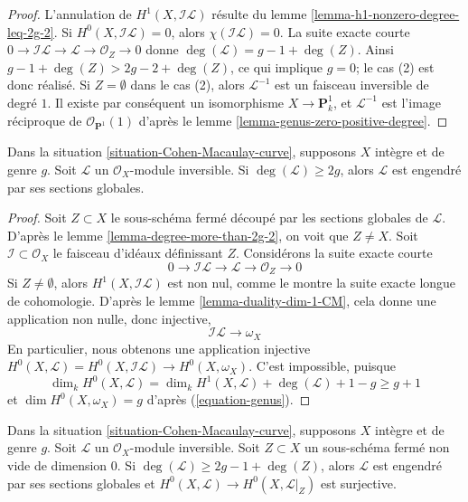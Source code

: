 \begin{proof}
L'annulation de $H^1(X, \mathcal{I}\mathcal{L})$ résulte du lemme \ref{lemma-h1-nonzero-degree-leq-2g-2}. Si $H^0(X, \mathcal{I}\mathcal{L}) = 0$, alors $\chi(\mathcal{I}\mathcal{L}) = 0$. La suite exacte courte $0 \to \mathcal{I}\mathcal{L} \to \mathcal{L} \to \mathcal{O}_Z \to 0$ donne $\deg(\mathcal{L}) = g - 1 + \deg(Z)$. Ainsi $g - 1 + \deg(Z) > 2g - 2 + \deg(Z)$, ce qui implique $g = 0$; le cas (2) est donc réalisé. Si $Z = \emptyset$ dans le cas (2), alors $\mathcal{L}^{-1}$ est un faisceau inversible de degré $1$. Il existe par conséquent un isomorphisme $X \to \mathbf{P}^1_k$, et $\mathcal{L}^{-1}$ est l'image réciproque de $\mathcal{O}_{\mathbf{P}^1}(1)$ d'après le lemme \ref{lemma-genus-zero-positive-degree}.
\end{proof}

\begin{lemma}
\label{lemma-degree-more-than-2g}
\begin{reference}
\cite[Lemma 3]{Jongmin}
\end{reference}
Dans la situation \ref{situation-Cohen-Macaulay-curve}, supposons $X$ intègre et de genre $g$. Soit $\mathcal{L}$ un $\mathcal{O}_X$-module inversible. Si $\deg(\mathcal{L}) \geq 2g$, alors $\mathcal{L}$ est engendré par ses sections globales.
\end{lemma}

\begin{proof}
Soit $Z \subset X$ le sous-schéma fermé découpé par les sections globales de $\mathcal{L}$. D'après le lemme \ref{lemma-degree-more-than-2g-2}, on voit que $Z \not = X$. Soit $\mathcal{I} \subset \mathcal{O}_X$ le faisceau d'idéaux définissant $Z$. Considérons la suite exacte courte $$
0 \to \mathcal{I}\mathcal{L}
\to \mathcal{L} \to \mathcal{O}_Z \to 0
$$ Si $Z \not = \emptyset$, alors $H^1(X, \mathcal{I}\mathcal{L})$ est non nul, comme le montre la suite exacte longue de cohomologie. D'après le lemme \ref{lemma-duality-dim-1-CM}, cela donne une application non nulle, donc injective, $$
\mathcal{I}\mathcal{L}
\longrightarrow
\omega_X
$$ En particulier, nous obtenons une application injective $H^0(X, \mathcal{L}) = H^0(X, \mathcal{I}\mathcal{L})
\to H^0(X, \omega_X)$. C'est impossible, puisque $$
\dim_k H^0(X, \mathcal{L}) = \dim_k H^1(X, \mathcal{L}) +
\deg(\mathcal{L}) + 1 - g \geq g + 1
$$ et $\dim H^0(X, \omega_X) = g$ d'après (\ref{equation-genus}).
\end{proof}

\begin{lemma}
\label{lemma-degree-more-than-2g-1-and-Z}
Dans la situation \ref{situation-Cohen-Macaulay-curve}, supposons $X$ intègre et de genre $g$. Soit $\mathcal{L}$ un $\mathcal{O}_X$-module inversible. Soit $Z \subset X$ un sous-schéma fermé non vide de dimension $0$. Si $\deg(\mathcal{L}) \geq 2g - 1 + \deg(Z)$, alors $\mathcal{L}$ est engendré par ses sections globales et $H^0(X, \mathcal{L}) \to H^0(X, \mathcal{L}|_Z)$ est surjective.
\end{lemma}


